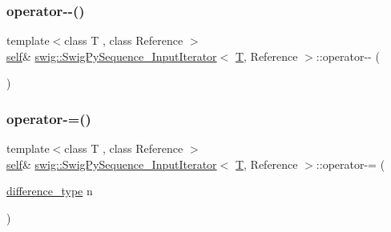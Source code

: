 \mbox{\label{structswig_1_1_swig_py_sequence___input_iterator_a9c735104cae5bce3a6f088de2e16163e}} 
\subsubsection{\texorpdfstring{operator-\/-\/()}{operator--()}}
{\footnotesize\ttfamily template$<$class T , class Reference $>$ \\
\hyperlink{structswig_1_1_swig_py_sequence___input_iterator_a3d3f028d1d9af412c61de2b5d8630321}{self}\& \hyperlink{structswig_1_1_swig_py_sequence___input_iterator}{swig\+::\+Swig\+Py\+Sequence\+\_\+\+Input\+Iterator}$<$ \hyperlink{fmt_8h_a0acb682b8260ab1c60b918599864e2e5}{T}, Reference $>$\+::operator-\/-\/ (\begin{DoxyParamCaption}{ }\end{DoxyParamCaption})\hspace{0.3cm}{\ttfamily [inline]}}

\mbox{\label{structswig_1_1_swig_py_sequence___input_iterator_a2156567b8085288817b8f2ed9a13500e}} 
\subsubsection{\texorpdfstring{operator-\/=()}{operator-=()}}
{\footnotesize\ttfamily template$<$class T , class Reference $>$ \\
\hyperlink{structswig_1_1_swig_py_sequence___input_iterator_a3d3f028d1d9af412c61de2b5d8630321}{self}\& \hyperlink{structswig_1_1_swig_py_sequence___input_iterator}{swig\+::\+Swig\+Py\+Sequence\+\_\+\+Input\+Iterator}$<$ \hyperlink{fmt_8h_a0acb682b8260ab1c60b918599864e2e5}{T}, Reference $>$\+::operator-\/= (\begin{DoxyParamCaption}\item[{\hyperlink{structswig_1_1_swig_py_sequence___input_iterator_af5e5d3f2d1906ceaf05c2215ee388096}{difference\+\_\+type}}]{n }\end{DoxyParamCaption})\hspace{0.3cm}{\ttfamily [inline]}}

